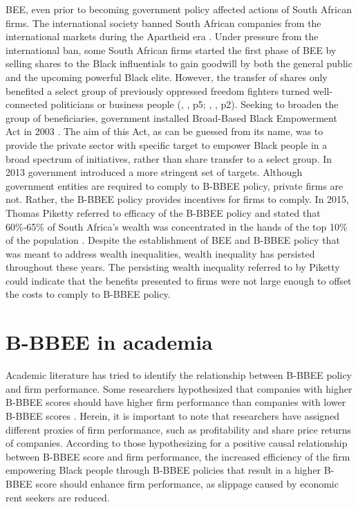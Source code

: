 BEE, even prior to becoming government policy affected actions of South African firms. The international society banned South African companies from the international markets during the Apartheid era \cite[p3]{N24}. Under pressure from the international ban, some South African firms started the first phase of BEE by selling shares to the Black influentials to gain goodwill by both the general public and the upcoming powerful Black elite. However, the transfer of shares only benefited a select group of previously oppressed freedom fighters turned well-connected politicians or business people (\citeauthor{N4}, \citeyear{N4}, p5; \citeauthor{N2}, \citeyear{N2}, p2). Seeking to broaden the group of beneficiaries, government installed Broad-Based Black Empowerment Act in 2003  \cite[p16]{N6}. The aim of this Act, as can be guessed from its name, was to provide the private sector with specific target to empower Black people in a broad spectrum of initiatives, rather than share transfer to a select group. In 2013 government introduced a more stringent set of targets. Although government entities are required to comply to B-BBEE policy, private firms are not. Rather, the B-BBEE policy provides incentives for firms to comply. In 2015, Thomas Piketty referred to efficacy of the B-BBEE policy and stated that 60\%-65\% of South Africa’s wealth was concentrated in the hands of the top 10\% of the population  \cite[]{N3}. Despite the establishment of BEE and B-BBEE policy that was meant to address wealth inequalities, wealth inequality has persisted throughout these years. The persisting wealth inequality referred to by Piketty could indicate that the benefits presented to firms were not large enough to offset the costs to comply to B-BBEE policy. 
\section{B-BBEE in academia}
Academic literature has tried to identify the relationship between B-BBEE policy and firm performance. Some researchers hypothesized that companies with higher B-BBEE scores should have higher firm performance than companies with lower B-BBEE scores  \cite[p19]{N4}. Herein, it is important to note that researchers have assigned different proxies of firm performance, such as profitability and share price returns of companies. According to those hypothesizing for a positive causal relationship between B-BBEE score and firm performance, the increased efficiency of the firm empowering Black people through B-BBEE policies that result in a higher B-BBEE score should enhance firm performance, as slippage caused by economic rent seekers are reduced.

